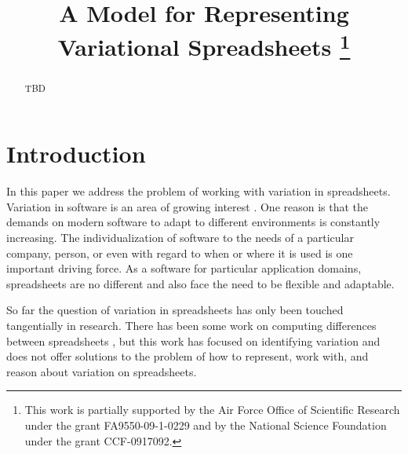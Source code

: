 \documentclass[conference]{IEEEtran}
\date{}
\begin{document}
\title{A Model for Representing Variational Spreadsheets
\thanks{This work is partially
supported by the Air Force Office of Scientific
Research under the grant FA9550-09-1-0229 and by the
National Science Foundation under the grant CCF-0917092.
}}

\author{
\and
{}
\and
{}
}

\maketitle

\begin{abstract}
TBD
\end{abstract}

\section{Introduction}
\label{sec:intro}

In this paper we address the problem of working with variation in
spreadsheets. Variation in software is an area of growing interest \cite{SPL,
FOSD, ...}. One reason is that the demands on modern software to adapt to
different environments is constantly increasing. The individualization of
software to the needs of a particular company, person, or even with regard to
when or where it is used is one important driving force.
%
As a software for particular application domains, spreadsheets are no
different and also face the need to be flexible and adaptable.

So far the question of variation in spreadsheets has only been touched
tangentially in research. There has been some work on computing differences
between spreadsheets \cite{CEL10hcc,Scaffidi12hcc.}, but this work has focused
on identifying variation and does not offer solutions to the problem of how to
represent, work with, and reason about variation on spreadsheets.
\end{document}
